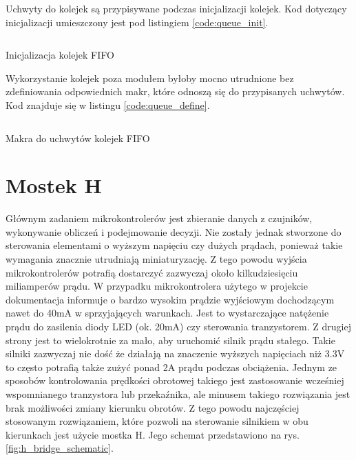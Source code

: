             Uchwyty do kolejek są przypisywane podczas inicjalizacji kolejek. Kod dotyczący inicjalizacji umieszczony jest pod listingiem \ref{code:queue_init}.
            
             \begin{kod}
              \inputminted[firstline=235, lastline=242]{cpp}{esp/listings/task_mngm.cpp}
              \caption{Inicjalizacja kolejek FIFO}
              \label{code:queue_init}
              \vspace{1em}
            \end{kod}          
            
            Wykorzystanie kolejek poza modułem byłoby mocno utrudnione bez zdefiniowania odpowiednich makr, które odnoszą się do przypisanych uchwytów. Kod znajduje się w listingu \ref{code:queue_define}.
            
             \begin{kod}
              \inputminted[firstline=63, lastline=71]{cpp}{esp/listings/task_mngm.hpp}
              \caption{Makra do uchwytów kolejek FIFO}
              \label{code:queue_define}
              \vspace{2em}
            \end{kod} 
            
            
        \section{Mostek H}
            Głównym zadaniem mikrokontrolerów jest zbieranie danych z czujników, wykonywanie obliczeń i podejmowanie decyzji. Nie zostały jednak stworzone do sterowania elementami o wyższym napięciu czy dużych prądach, ponieważ takie wymagania znacznie utrudniają miniaturyzację. Z tego powodu wyjścia mikrokontrolerów potrafią dostarczyć zazwyczaj około kilkudziesięciu miliamperów prądu. W przypadku mikrokontrolera użytego w projekcie dokumentacja \cite{esp32} informuje o bardzo wysokim prądzie wyjściowym dochodzącym nawet do 40mA w sprzyjających warunkach. Jest to wystarczające natężenie prądu do zasilenia diody LED (ok. 20mA) czy sterowania tranzystorem. Z drugiej strony jest to wielokrotnie za mało, aby uruchomić silnik prądu stałego. Takie silniki zazwyczaj nie dość że działają na znaczenie wyższych napięciach niż 3.3V to często potrafią także zużyć ponad 2A prądu podczas obciążenia. Jednym ze sposobów kontrolowania prędkości obrotowej takiego jest zastosowanie wcześniej wspomnianego tranzystora lub przekaźnika, ale minusem takiego rozwiązania jest brak możliwości zmiany kierunku obrotów. Z tego powodu najczęściej stosowanym rozwiązaniem, które pozwoli na sterowanie silnikiem w obu kierunkach jest użycie mostka H. Jego schemat przedstawiono na rys. \ref{fig:h_bridge_schematic}.
            
